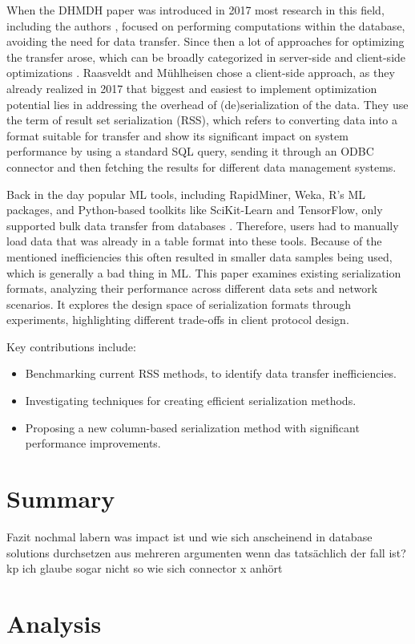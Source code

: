 \documentclass[sigconf]{acmart}
\begin{document}
When the DHMDH paper was introduced in 2017 most research in this field, including the authors \cite{raasveldt2016vectorized}, focused on performing computations within the database, avoiding the need for data transfer. Since then a lot of approaches for optimizing the transfer arose, which can be broadly categorized in server-side and client-side optimizations \cite{neueres paper}. Raasveldt and Mühlheisen chose a client-side approach, as they already realized in 2017 that biggest and easiest to implement optimization potential lies in addressing the overhead of (de)serialization of the data. 
They use the term of result set serialization (RSS), which refers to converting data into a format suitable for transfer and show its significant impact on system performance by using a standard SQL query, sending it through an ODBC connector and then fetching the results for different data management systems. 

Back in the day popular ML tools, including RapidMiner, Weka, R's ML packages, and Python-based toolkits like SciKit-Learn and TensorFlow, only supported bulk data transfer from databases \cite{viele papperpereper}. Therefore, users had to manually load data that was already in a table format into these tools. Because of the mentioned inefficiencies this often resulted in smaller data samples being used, which is generally a bad thing in ML.
This paper examines existing serialization formats, analyzing their performance across different data sets and network scenarios. It explores the design space of serialization formats through experiments, highlighting different trade-offs in client protocol design.

Key contributions include:
\begin{itemize}
  \item Benchmarking current RSS methods, to identify data transfer inefficiencies.
  \item Investigating techniques for creating efficient serialization methods.
  \item Proposing a new column-based serialization method with significant performance improvements.
\end{itemize}




\section{Summary}
Fazit nochmal labern was impact ist und wie sich anscheinend in database solutions durchsetzen aus mehreren argumenten wenn das tatsächlich der fall ist? kp
ich glaube sogar nicht so wie sich connector x anhört


\section{Analysis}



\end{document}
